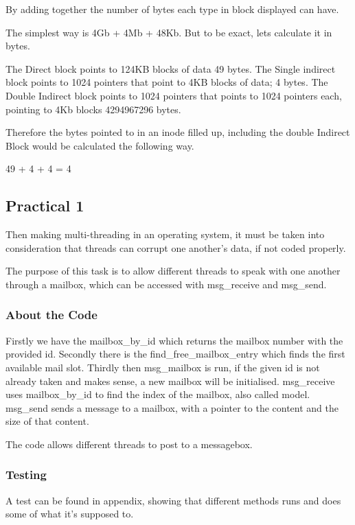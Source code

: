 \documentclass[11pt,a4paper]{article}
\theoremstyle{plain}
\theoremstyle{definition}
\theoremstyle{remark}
\numberwithin{equation}{section}
\begin{document}
By adding together the number of bytes each type in block displayed can have.

The simplest way is 4Gb + 4Mb + 48Kb. But to be exact, lets calculate it in bytes.

The Direct block points to 124KB blocks of data 49 bytes.
The Single indirect block points to 1024 pointers that point to 4KB blocks of data; 4 bytes.
The Double Indirect block points to 1024 pointers that points to 1024 pointers each, pointing to 4Kb blocks 4294967296 bytes.

Therefore the bytes pointed to in an inode filled up, including the double Indirect Block would be calculated the following way.

49 + 4 + 4 = 4


\subsection*{Practical 1}

Then making multi-threading in an operating system, it must be taken into consideration that threads can corrupt one another's data, if not coded properly.

The purpose of this task is to allow different threads to speak with one another through a mailbox, which can be accessed with msg\_receive and msg\_send.


\subsubsection*{About the Code}

Firstly we have the mailbox\_by\_id which returns the mailbox number with the provided id.
Secondly there is the find\_free\_mailbox\_entry which finds the first available mail slot.
Thirdly then msg\_mailbox is run, if the given id is not already taken and makes sense, a new mailbox will be initialised.
msg\_receive uses mailbox\_by\_id to find the index of the mailbox, also called model.
msg\_send sends a message to a mailbox, with a pointer to the content and the size of that content.


The code allows different threads to post to a messagebox.


\subsubsection*{Testing}

A test can be found in appendix, showing that different methods runs and does some of what it's supposed to.
\end{document}
